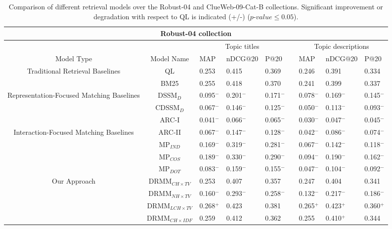 \documentclass{sig-alternate-05-2015}
\begin{document}
\begin{table*}[!ht]\centering
  \caption{Comparison of different retrieval models over the Robust-04 and ClueWeb-09-Cat-B collections. Significant improvement or degradation with respect to QL is indicated (+/-) ($p$-$value \le 0.05$).}
  \begin{tabular}{c c l l l l l l l}
  \multicolumn{9}{c}{Robust-04 collection} \\
  \hline \hline
    & & \multicolumn{3}{c}{Topic titles} & & \multicolumn{3}{c}{Topic descriptions} \\\cline{3-5}\cline{7-9}
    Model Type & Model Name & MAP & nDCG@20 & P@20  & & MAP & nDCG@20 & P@20 \\\hline
    \multirow{2}{3cm}{\centering Traditional Retrieval Baselines} & QL & 0.253 & 0.415 & 0.369  & & 0.246 & 0.391 & 0.334 \\
    & BM25 & 0.255 & 0.418 & 0.370 & & 0.241 & 0.399 & 0.337  \\\hline
    \multirow{3}{3.4cm}{\centering Representation-Focused Matching Baselines}& DSSM$_D$ & 0.095$^-$  & 0.201$^-$ & 0.171$^-$ &  &  0.078$^-$ & 0.169$^-$ & 0.145$^-$ \\
    & CDSSM$_D$ & 0.067$^-$ & 0.146$^-$ & 0.125$^-$ &  & 0.050$^-$ & 0.113$^-$ & 0.093$^-$  \\
    & ARC-I & 0.041$^-$ & 0.066$^-$ & 0.065$^-$  &  &  0.030$^-$  & 0.047$^-$ &  0.045$^-$  \\\hline
    \multirow{4}{3cm}{\centering Interaction-Focused Matching Baselines}& ARC-II & 0.067$^-$ & 0.147$^-$ & 0.128$^-$ &  & 0.042$^-$ & 0.086$^-$ & 0.074$^-$ \\
    & MP$_{IND}$ & 0.169$^-$ & 0.319$^-$ & 0.281$^-$ & & 0.067$^-$ & 0.142$^-$ & 0.118$^-$ \\
    & MP$_{COS}$ & 0.189$^-$ & 0.330$^-$ & 0.290$^-$ &  &0.094$^-$ & 0.190$^-$ & 0.162$^-$  \\
    & MP$_{DOT}$ & 0.083$^-$ & 0.159$^-$ & 0.155$^-$ & & 0.047$^-$ & 0.104$^-$ & 0.092$^-$  \\\hline
    \multirow{6}{3cm}{\centering Our Approach} & DRMM$_{CH\times TV}$ & 0.253 & 0.407 & 0.357 & & 0.247 & 0.404 & 0.341 \\
    &DRMM$_{NH\times TV}$ & 0.160$^-$ & 0.293$^-$ & 0.258$^-$ & & 0.132$^-$  & 0.217$^-$ & 0.186$^-$ \\
    &DRMM$_{LCH\times TV}$ & 0.268$^+$ & 0.423 & 0.381 & & 0.265$^+$ & 0.423$^+$ & 0.360$^+$ \\
    &DRMM$_{CH\times IDF}$ & 0.259 & 0.412 & 0.362 & & 0.255 & 0.410$^+$ & 0.344 \\

\end{tabular}
\end{table*}
\end{document}
